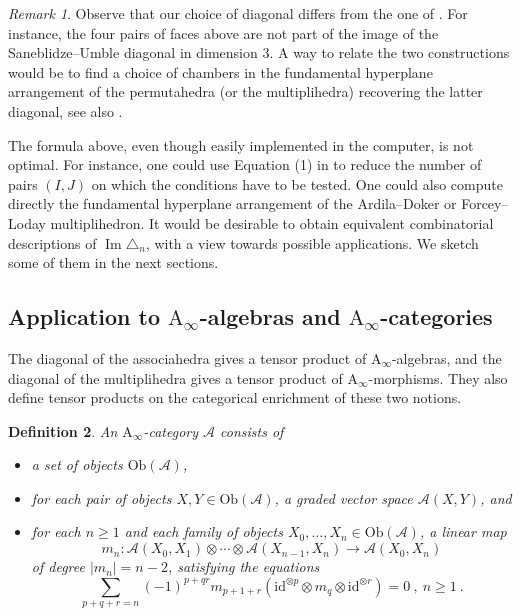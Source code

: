 \documentclass[twoside, 12pt]{amsart}
\newtheorem{definition}{Definition}[section]
\theoremstyle{remark}
\newtheorem{remark}[definition]{\sc Remark}
\newcommand{\id}{\mathrm{id}}
\newcommand{\cat}[1]{\mathcal{#1}}
\DeclareMathOperator{\Ima}{Im} %
\begin{document}
\begin{remark}
Observe that our choice of diagonal differs from the one of \cite{SaneblidzeUmble04}. 
For instance, the four pairs of faces above are not part of the image of the Saneblidze--Umble diagonal in dimension $3$. 
A way to relate the two constructions would be to find a choice of chambers in the fundamental hyperplane arrangement of the permutahedra (or the multiplihedra) recovering the latter diagonal, see also \cite[Remark~3.18]{LA21}.
\end{remark}

The formula above, even though easily implemented in the computer, is not optimal. For instance, one could use Equation (1) in \cite[Theorem 1.23]{LA21} to reduce the number of pairs $(I,J)$ on which the conditions have to be tested. 
One could also compute directly the fundamental hyperplane arrangement of the Ardila--Doker or Forcey--Loday multiplihedron.
It would be desirable to obtain equivalent combinatorial descriptions of $\Ima \triangle_n$, with a view towards possible applications. 
We sketch some of them in the next sections.




\subsection{Application to $\mathrm{A}_\infty$-algebras and $\mathrm{A}_\infty$-categories} 
\label{sec:Ainftycat}

The diagonal of the associahedra gives a tensor product of $\mathrm{A}_\infty$-algebras, and the diagonal of the multiplihedra gives a tensor product of $\mathrm{A}_\infty$-morphisms.
They also define tensor products on the categorical enrichment of these two notions. 

\begin{definition} 
An $\mathrm{A}_\infty$-category $\cat{A}$ consists of 
\begin{itemize}
  \item a set of objects $\mathrm{Ob}(\cat{A})$,
  \item for each pair of objects $X,Y \in \mathrm{Ob}(\cat{A})$, a graded vector space $\cat{A}(X,Y)$, and
  \item for each $n\geq 1$ and each family of objects $X_0,\ldots,X_n \in \mathrm{Ob}(\cat{A})$, a linear map \[m_n : \cat{A}(X_0,X_1) \otimes \cdots \otimes \cat{A}(X_{n-1},X_n) \to \cat{A}(X_0,X_n)\] of degree $|m_n|=n-2$, satisfying the equations \[\sum_{p+q+r=n} (-1)^{p+qr}m_{p+1+r}(\id^{\otimes p} \otimes m_q \otimes \id^{\otimes r}) = 0 \ , \ n\geq 1 \ .\]
\end{itemize}
\end{definition}
\end{document}
